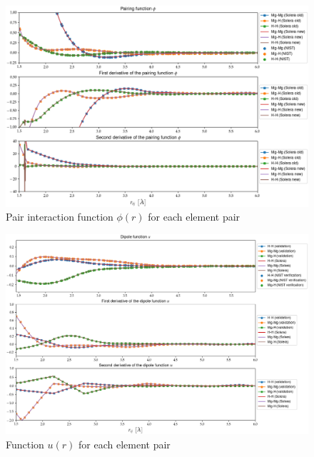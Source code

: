 \documentclass{article}
\begin{document}
\begin{figure}[h!]
	\centering
	\includegraphics[width=\textwidth]{Figures/Fig-Pairing-Function.png}
	\caption{Pair interaction function $\phi(r)$ for each element pair}
\end{figure}

\begin{figure}[h!]
	\centering
	\includegraphics[width=\textwidth]{Figures/Fig-Dipole-Function.png}
	\caption{Function $u(r)$ for each element pair}
\end{figure}
\end{document}
